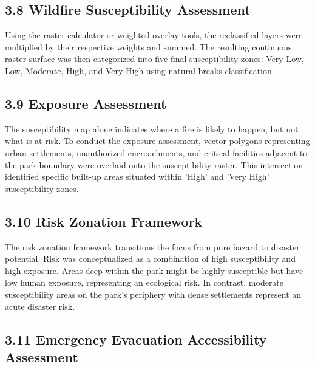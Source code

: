 \documentclass[12pt,a4paper]{article}
\begin{document}
\subsection*{3.8 Wildfire Susceptibility Assessment}

Using the raster calculator or weighted overlay tools, the reclassified layers were multiplied by their respective weights and summed. The resulting continuous raster surface was then categorized into five final susceptibility zones: Very Low, Low, Moderate, High, and Very High using natural breaks classification.



\subsection*{3.9 Exposure Assessment}

The susceptibility map alone indicates where a fire is likely to happen, but not what is at risk. To conduct the exposure assessment, vector polygons representing urban settlements, unauthorized encroachments, and critical facilities adjacent to the park boundary were overlaid onto the susceptibility raster. This intersection identified specific built-up areas situated within 'High' and 'Very High' susceptibility zones.



\subsection*{3.10 Risk Zonation Framework}

The risk zonation framework transitions the focus from pure hazard to disaster potential. Risk was conceptualized as a combination of high susceptibility and high exposure. Areas deep within the park might be highly susceptible but have low human exposure, representing an ecological risk. In contrast, moderate susceptibility areas on the park's periphery with dense settlements represent an acute disaster risk.



\subsection*{3.11 Emergency Evacuation Accessibility Assessment}
\end{document}
